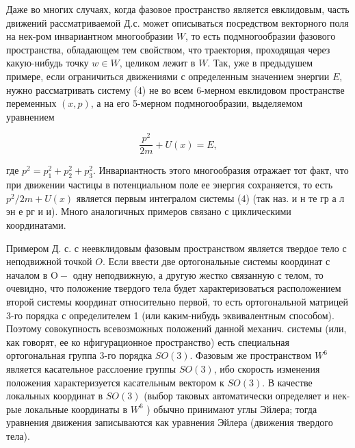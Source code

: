 \documentclass[10pt]{article}
\begin{document}
Даже во многих случаях, когда фазовое пространство является евклидовым, часть движений рассматриваемой Д.с. может описываться посредством векторного поля на нек-ром инвариантном многообразии $W$, то есть подмногообразии фазового пространства, обладающем тем свойством, что траектория, проходящая через какую-нибудь точку $w \in W$, целиком лежит в $W$. Так, уже в предыдушем примере, если ограничиться движениями с определенным значением энергии $E$, нужно рассматривать систему (4) не во всем 6-мерном евклидовом пространстве переменных $(x, p)$, а на его 5-мерном подмногообразии, выделяемом уравнением



\[

\frac{p^{2}}{2 m}+U(x)=E,

\]



где $p^{2}=p_{1}^{2}+p_{2}^{2}+p_{3}^{2}$. Инвариантность этого многообразия отражает тот факт, что при движении частицы в потенциальном поле ее энергия сохраняется, то есть $p^{2} / 2 m+U(x)$ является первым интегралом системы (4) (так наз. и н те гр а л эн е рг и и). Много аналогичных примеров связано с циклическими координатами.



Примером Д. с. с неевклидовым фазовым пространством является твердое тело с неподвижной точкой $O$. Если ввести две ортогональные системы координат с началом в $\mathrm{O}-$ одну неподвижную, а другую жестко связанную с телом, то очевидно, что положение твердого тела будет характеризоваться расположением второй системы координат относительно первой, то есть ортогональной матрицей 3-го порядка с определителем 1 (или каким-нибудь эквивалентным способом). Поэтому совокупность всевозможных положений данной механич. системы (или, как говорят, ее ко нфигурационное пространство) есть специальная ортогональная группа 3-го порядка $S O(3)$. Фазовым же пространством $W^{6}$ является касательное расслоение группы $S O(3)$, ибо скорость изменения положения характеризуется касательным вектором к $S O(3)$. В качестве локальных координат в $S O(3)$ (выбор таковых автоматически определяет и нек-рые локальные координаты в $W^{6}$ ) обычно принимают углы Эйлера; тогда уравнения движения записываются как уравнения Эйлера (движения твердого тела).
\end{document}
